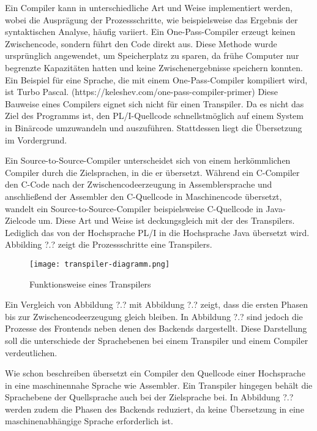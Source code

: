 Ein Compiler kann in unterschiedliche Art und Weise implementiert werden, wobei die Ausprägung der Prozessschritte, wie beispielsweise das Ergebnis der syntaktischen Analyse, häufig variiert. Ein One-Pass-Compiler erzeugt keinen Zwischencode, sondern führt den Code direkt aus. Diese Methode wurde ursprünglich angewendet, um Speicherplatz zu sparen, da frühe Computer nur begrenzte Kapazitäten hatten und keine Zwischenergebnisse speichern konnten. Ein Beispiel für eine Sprache, die mit einem One-Pass-Compiler kompiliert wird, ist Turbo Pascal. (https://keleshev.com/one-pass-compiler-primer)
Diese Bauweise eines Compilers eignet sich nicht für einen Transpiler. Da es nicht das Ziel des Programms ist, den PL/I-Quellcode schnellstmöglich auf einem System in Binärcode umzuwandeln und auszuführen. Stattdessen liegt die Übersetzung im Vordergrund.

Ein Source-to-Source-Compiler unterscheidet sich von einem herkömmlichen Compiler durch die Zielsprachen, in die er übersetzt. Während ein C-Compiler den C-Code nach der Zwischencodeerzeugung in Assemblersprache und anschließend der Assembler den C-Quellcode in Maschinencode übersetzt, wandelt ein Source-to-Source-Compiler beispielsweise C-Quellcode in Java-Zielcode um. 
Diese Art und Weise ist deckungsgleich mit der des Transpilers. Lediglich das von der Hochsprache PL/I in die Hochsprache Java übersetzt wird.
Abbilding ?.? zeigt die Prozessschritte eine Transpilers.

\pagebreak
\begin{figure}[h]
  \centering
  \caption{Funktionsweise eines Transpilers}
  \texttt{[image: transpiler-diagramm.png]}
  \label{fig:transpiler}
\end{figure}
\pagebreak

Ein Vergleich von Abbildung ?.? mit Abbildung ?.? zeigt, dass die ersten Phasen bis zur Zwischencodeerzeugung gleich bleiben. In Abbildung ?.? sind jedoch die Prozesse des Frontends neben denen des Backends dargestellt. Diese Darstellung soll die unterschiede der Sprachebenen bei einem Transpiler und einem Compiler verdeutlichen.

Wie schon beschreiben übersetzt ein Compiler den Quellcode einer Hochsprache in eine maschinennahe Sprache wie Assembler. Ein Transpiler hingegen behält die Sprachebene der Quellsprache auch bei der Zielsprache bei. In Abbildung ?.? werden zudem die Phasen des Backends reduziert, da keine Übersetzung in eine maschinenabhängige Sprache erforderlich ist.

